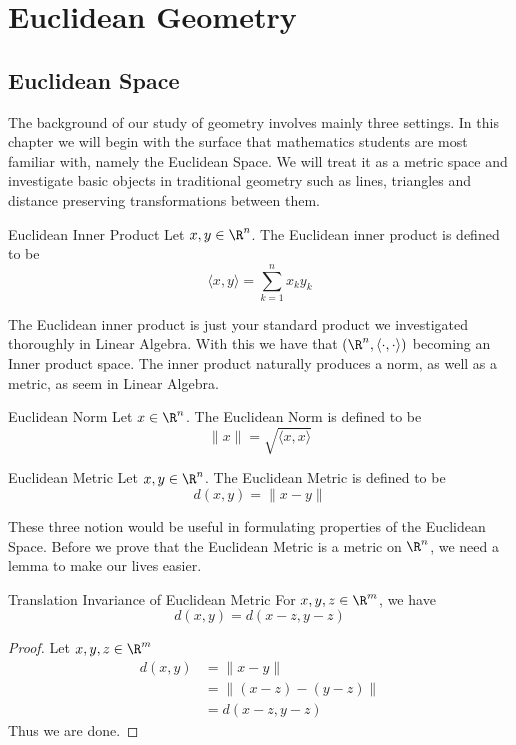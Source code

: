 \section{Euclidean Geometry}
\subsection{Euclidean Space}
The background of our study of geometry involves mainly three settings. In this chapter we will begin with the surface that mathematics students are most familiar with, namely the Euclidean Space. We will treat it as a metric space and investigate basic objects in traditional geometry such as lines, triangles and distance preserving transformations between them. 

\begin{defn}{Euclidean Inner Product}{} Let $x,y\in \R^n$. The Euclidean inner product is defined to be $$\langle x,y\rangle=\sum_{k=1}^nx_ky_k$$
\end{defn}

The Euclidean inner product is just your standard product we investigated thoroughly in Linear Algebra. With this we have that $(\R^n,\langle\cdot,\cdot\rangle)$ becoming an Inner product space. The inner product naturally produces a norm, as well as a metric, as seem in Linear Algebra. 

\begin{defn}{Euclidean Norm}{} Let $x\in \R^n$. The Euclidean Norm is defined to be $$\|x\|=\sqrt{\langle x,x\rangle}$$
\end{defn}

\begin{defn}{Euclidean Metric}{} Let $x,y\in \R^n$. The Euclidean Metric is defined to be $$d(x,y)=\|x-y\|$$
\end{defn}

These three notion would be useful in formulating properties of the Euclidean Space. Before we prove that the Euclidean Metric is a metric on $\R^n$, we need a lemma to make our lives easier. 

\begin{lmm}{Translation Invariance of Euclidean Metric}{} For $x,y,z\in\R^m$, we have $$d(x,y)=d(x-z,y-z)$$ \tcbline
\begin{proof}
Let $x,y,z\in\R^m$
\begin{align*}
d(x,y)&=\|x-y\|\\
&=\|(x-z)-(y-z)\|\\
&=d(x-z,y-z)
\end{align*}
Thus we are done. 
\end{proof}
\end{lmm}


